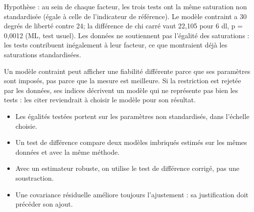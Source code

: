 \documentclass[
  french,
  11pt,
  a4paper,
  DIV=11,
  numbers=noendperiod]{scrreprt}
\providecommand{\tightlist}{%
  \setlength{\itemsep}{0pt}\setlength{\parskip}{0pt}}
\begin{document}
\begin{tcolorbox}[enhanced jigsaw, arc=.35mm, bottomrule=.15mm, bottomtitle=1mm, breakable, colback=white, colbacktitle=quarto-callout-tip-color!10!white, colframe=quarto-callout-tip-color-frame, coltitle=black, left=2mm, leftrule=.75mm, opacityback=0, opacitybacktitle=0.6, rightrule=.15mm, title={Réponse}, titlerule=0mm, toprule=.15mm, toptitle=1mm]

Hypothèse : au sein de chaque facteur, les trois tests ont la même
saturation non standardisée (égale à celle de l'indicateur de
référence). Le modèle contraint a 30 degrés de liberté contre 24; la
différence de chi carré vaut 22,105 pour 6 dl, p = 0,0012 (ML, test
usuel). Les données ne soutiennent pas l'égalité des saturations : les
tests contribuent inégalement à leur facteur, ce que montraient déjà les
saturations standardisées.

Un modèle contraint peut afficher une fiabilité différente parce que ses
paramètres sont imposés, pas parce que la mesure est meilleure. Si la
restriction est rejetée par les données, ses indices décrivent un modèle
qui ne représente pas bien les tests : les citer reviendrait à choisir
le modèle pour son résultat.

\end{tcolorbox}

\begin{tcolorbox}[enhanced jigsaw, arc=.35mm, bottomrule=.15mm, bottomtitle=1mm, breakable, colback=white, colbacktitle=quarto-callout-important-color!10!white, colframe=quarto-callout-important-color-frame, coltitle=black, left=2mm, leftrule=.75mm, opacityback=0, opacitybacktitle=0.6, rightrule=.15mm, title={À retenir}, titlerule=0mm, toprule=.15mm, toptitle=1mm]

\begin{itemize}
\tightlist
\item
  Les égalités testées portent sur les paramètres non standardisés, dans
  l'échelle choisie.
\item
  Un test de différence compare deux modèles imbriqués estimés sur les
  mêmes données et avec la même méthode.
\item
  Avec un estimateur robuste, on utilise le test de différence corrigé,
  pas une soustraction.
\item
  Une covariance résiduelle améliore toujours l'ajustement : sa
  justification doit précéder son ajout.
\end{itemize}

\end{tcolorbox}
\end{document}

